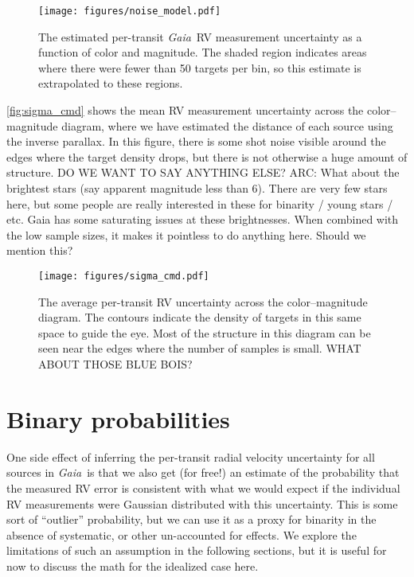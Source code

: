 \documentclass[modern, letterpaper]{aastex631}
\newcommand{\project}[1]{\textsl{#1}}
\newcommand{\Gaia}{\project{Gaia}}
\begin{document}
\begin{figure}
	\begin{centering}
		\texttt{[image: figures/noise\_model.pdf]}
		\caption{The estimated per-transit \Gaia\ RV measurement uncertainty as a function of color and magnitude.
			The shaded region indicates areas where there were fewer than 50 targets per bin, so this estimate is extrapolated to these regions.}
		\label{fig:noise_model}
	\end{centering}
\end{figure}

\autoref{fig:sigma_cmd} shows the mean RV measurement uncertainty across the color--magnitude diagram, where we have estimated the distance of each source using the inverse parallax.
In this figure, there is some shot noise visible around the edges where the target density drops, but there is not otherwise a huge amount of structure.
DO WE WANT TO SAY ANYTHING ELSE?
ARC: What about the brightest stars (say apparent magnitude less than 6). There are very few stars here, but some people are really interested in these for binarity / young stars / etc. Gaia has some saturating issues at these brightnesses. When combined with the low sample sizes, it makes it pointless to do anything here. Should we mention this?

\begin{figure}
	\begin{centering}
		\texttt{[image: figures/sigma\_cmd.pdf]}
		\caption{The average per-transit RV uncertainty across the color--magnitude diagram.
			The contours indicate the density of targets in this same space to guide the eye.
			Most of the structure in this diagram can be seen near the edges where the number of samples is small.
			WHAT ABOUT THOSE BLUE BOIS?}
		\label{fig:sigma_cmd}
	\end{centering}
\end{figure}


\section{Binary probabilities}

One side effect of inferring the per-transit radial velocity uncertainty for all sources in \Gaia\ is that we also get (for free!) an estimate of the probability that the measured RV error is consistent with what we would expect if the individual RV measurements were Gaussian distributed with this uncertainty.
This is some sort of ``outlier'' probability, but we can use it as a proxy for binarity in the absence of systematic, or other un-accounted for effects.
We explore the limitations of such an assumption in the following sections, but it is useful for now to discuss the math for the idealized case here.
\end{document}
